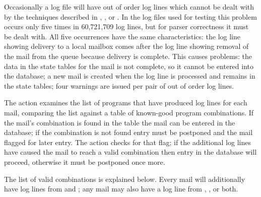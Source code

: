 \label{out of order log lines}

Occasionally a log file will have out of order log lines which cannot be
dealt with by the techniques described in , , or .  In the \numberOFlogFILES{} log files used for
testing this problem occurs only five times in 60,721,709 log lines, but
for parser correctness it must be dealt with.  All five occurrences have
the same characteristics: the  log line showing delivery to a
local mailbox comes after the  log line showing removal of the
mail from the queue because delivery is complete.  This causes problems:
the data in the state tables for the mail is not complete, so it cannot be
entered into the database; a new mail is created when the 
log line is processed and remains in the state tables; four warnings are
issued per pair of out of order log lines.

The  action examines the list of programs that have produced
log lines for each mail, comparing the list against a table of known-good
program combinations.  If the mail's combination is found in the table the
mail can be entered in the database; if the combination is not found entry
must be postponed and the mail flagged for later entry.  The
 action checks for that flag; if the additional log
lines have caused the mail to reach a valid combination then entry in the
database will proceed, otherwise it must be postponed once more.

The list of valid combinations is explained below.  Every mail will
additionally have log lines from  and ; any
mail may also have a log line from , , or
both.

